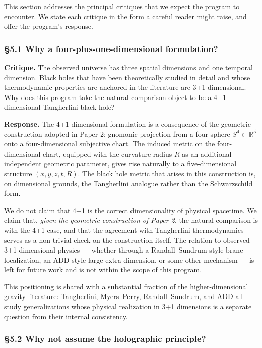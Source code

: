 \documentclass[a4paper,11pt]{article}
\theoremstyle{definition}
\begin{document}
This section addresses the principal critiques that we expect the
program to encounter. We state each critique in the form a careful
reader might raise, and offer the program's response.

\subsubsection{§5.1 Why a four-plus-one-dimensional
formulation?}\label{why-a-four-plus-one-dimensional-formulation}

\textbf{Critique.} The observed universe has three spatial dimensions
and one temporal dimension. Black holes that have been theoretically
studied in detail and whose thermodynamic properties are anchored in the
literature are 3+1-dimensional. Why does this program take the natural
comparison object to be a 4+1-dimensional Tangherlini black hole?

\textbf{Response.} The 4+1-dimensional formulation is a consequence of
the geometric construction adopted in Paper 2: gnomonic projection from
a four-sphere \(S^4 \subset \mathbb{R}^5\) onto a four-dimensional
subjective chart. The induced metric on the four-dimensional chart,
equipped with the curvature radius \(R\) as an additional independent
geometric parameter, gives rise naturally to a five-dimensional
structure \((x, y, z, t, R)\). The black hole metric that arises in this
construction is, on dimensional grounds, the Tangherlini analogue rather
than the Schwarzschild form.

We do not claim that 4+1 is the correct dimensionality of physical
spacetime. We claim that, \emph{given the geometric construction of
Paper 2}, the natural comparison is with the 4+1 case, and that the
agreement with Tangherlini thermodynamics serves as a non-trivial check
on the construction itself. The relation to observed 3+1-dimensional
physics --- whether through a Randall--Sundrum-style brane localization,
an ADD-style large extra dimension, or some other mechanism --- is left
for future work and is not within the scope of this program.

This positioning is shared with a substantial fraction of the
higher-dimensional gravity literature: Tangherlini, Myers--Perry,
Randall--Sundrum, and ADD all study generalizations whose physical
realization in 3+1 dimensions is a separate question from their internal
consistency.

\subsubsection{§5.2 Why not assume the holographic
principle?}\label{why-not-assume-the-holographic-principle}
\end{document}
